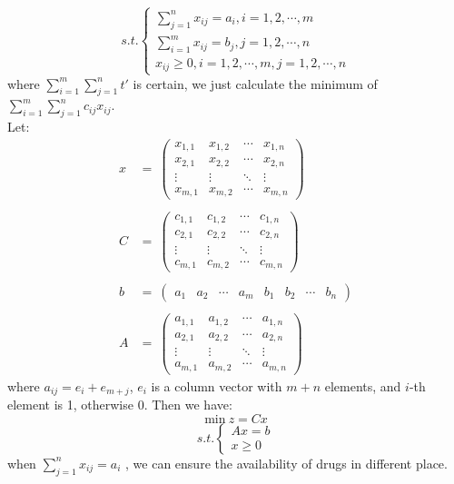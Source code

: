 $$
s.t. \left\{
\begin{array}{l}
  \sum_{j=1}^{n}x_{ij}=a_i,i=1,2,\cdots,m \\
  \sum_{i=1}^{m}x_{ij}=b_j,j=1,2,\cdots,n \\
  x_{ij}\geq 0,i=1,2,\cdots,m, j=1,2,\cdots,n
\end{array}\right.
$$
where $ \sum_{i=1}^{m}\sum_{j=1}^{n}t' $ is certain, 
we just calculate the minimum of 
$ \sum_{i=1}^{m}\sum_{j=1}^{n}c_{ij}x_{ij} $.\\
Let:
$$
\begin{array}{ll}
x & = ~\begin{pmatrix}
	  x_{1,1} & x_{1,2} & \cdots & x_{1,n} \\
	  x_{2,1} & x_{2,2} & \cdots & x_{2,n} \\
	  \vdots  & \vdots  & \ddots & \vdots  \\
	  x_{m,1} & x_{m,2} & \cdots & x_{m,n}
	 \end{pmatrix}\\\\
C & = ~\begin{pmatrix}
	  c_{1,1} & c_{1,2} & \cdots & c_{1,n} \\
	  c_{2,1} & c_{2,2} & \cdots & c_{2,n} \\
	  \vdots  & \vdots  & \ddots & \vdots  \\
	  c_{m,1} & c_{m,2} & \cdots & c_{m,n}
	 \end{pmatrix}\\\\
b & = ~\begin{pmatrix}
	  a_1 & a_2 & \cdots & a_m & b_1 & b_2 & \cdots & b_n
	 \end{pmatrix}\\\\
A & = ~\begin{pmatrix}
	  a_{1,1} & a_{1,2} & \cdots & a_{1,n} \\
	  a_{2,1} & a_{2,2} & \cdots & a_{2,n} \\
	  \vdots  & \vdots  & \ddots & \vdots  \\
	  a_{m,1} & a_{m,2} & \cdots & a_{m,n}
	 \end{pmatrix}
\end{array}
$$
where $ a_{ij}=e_i+e_{m+j} $, $ e_{i} $ is a column vector with
$ m+n $ elements, and $i$-th element is 1, otherwise 0. Then we
have:
$$
\mathrm{min}~z=Cx
$$
$$
s.t. \left\{\begin{array}{r}
  Ax=b\\
  x\geq 0
\end{array}\right.
$$
when $ \sum_{j=1}^{n}x_{ij}=a_i $ \cite{bib4}, we can ensure the
availability of drugs in different place.